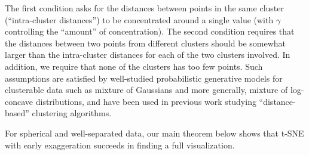 The first condition asks for the distances between points in the same cluster (``intra-cluster distances'') to be concentrated around a single value (with $\gamma$ controlling the ``amount'' of concentration). The second condition requires that the distances between two points from different clusters should be somewhat larger than the intra-cluster distances for each of the two clusters involved. In addition, we require that none of the clusters has too few points. Such assumptions are satisfied by well-studied probabilistic generative models for clusterable data such as mixture of Gaussians and more generally, mixture of log-concave distributions, and have been used in previous work \citep{DBLP:conf/focs/Dasgupta99,arora2005learning} studying ``distance-based'' clustering algorithms.  



For spherical and well-separated data, our main theorem below shows that t-SNE with early exaggeration succeeds in finding a full visualization.   

